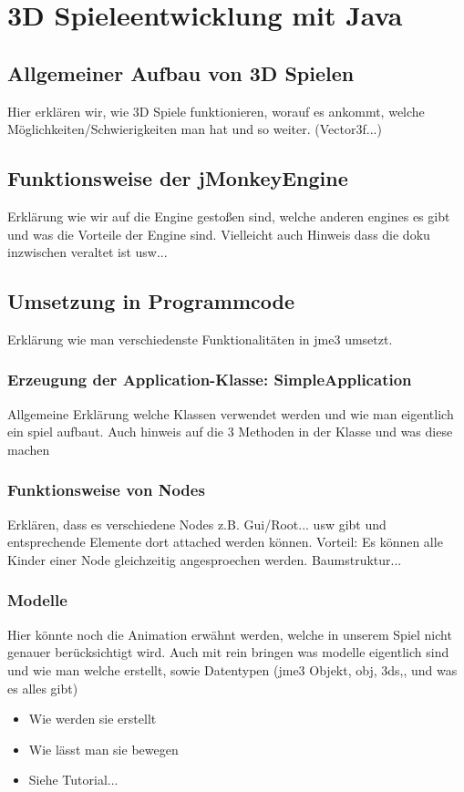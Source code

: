 \chapter{3D Spieleentwicklung mit Java}\label{ch:beispiele}

\section{Allgemeiner Aufbau von 3D Spielen}\label{sec:aufbau}
Hier erklären wir, wie 3D Spiele funktionieren, worauf es ankommt, welche Möglichkeiten/Schwierigkeiten man hat und so weiter. (Vector3f...)

\section{Funktionsweise der jMonkeyEngine}\label{sec:jMonkeyEngine}
Erklärung wie wir auf die Engine gestoßen sind, welche anderen engines es gibt und was die Vorteile der Engine sind. Vielleicht auch Hinweis dass die doku inzwischen veraltet ist usw...

\section{Umsetzung in Programmcode}\label{sec:code}
Erklärung wie man verschiedenste Funktionalitäten in jme3 umsetzt.

\subsection{Erzeugung der Application-Klasse: SimpleApplication}
Allgemeine Erklärung welche Klassen verwendet werden und wie man eigentlich ein spiel aufbaut. Auch hinweis auf die 3 Methoden in der Klasse und was diese machen

\subsection{Funktionsweise von Nodes}
Erklären, dass es verschiedene Nodes z.B. Gui/Root... usw gibt und entsprechende Elemente dort attached werden können.
Vorteil: Es können alle Kinder einer Node gleichzeitig angesproechen werden. Baumstruktur...

\subsection{Modelle}
Hier könnte noch die Animation erwähnt werden, welche in unserem Spiel nicht genauer berücksichtigt wird.
Auch mit rein bringen was modelle eigentlich sind und wie man welche erstellt, sowie Datentypen (jme3 Objekt, obj, 3ds,, und was es alles gibt)
\begin{itemize}
	\item Wie werden sie erstellt
	\item Wie lässt man sie bewegen
	\item Siehe Tutorial...
\end{itemize}

